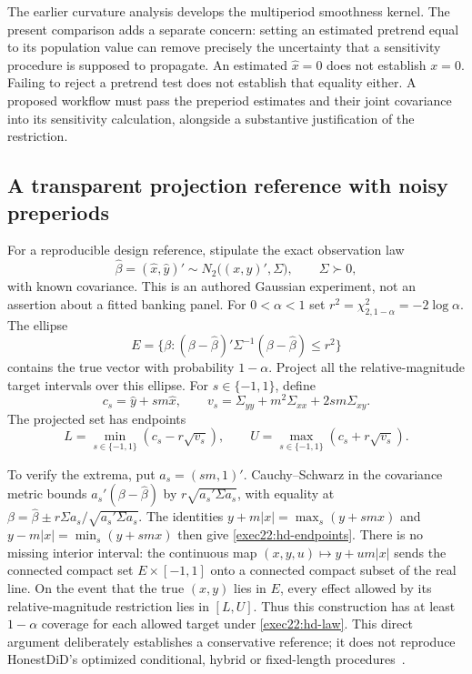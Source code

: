 The earlier curvature analysis develops the multiperiod smoothness kernel.
The present comparison adds a separate concern: setting an estimated pretrend
equal to its population value can remove precisely the uncertainty that a
sensitivity procedure is supposed to propagate. An estimated $\widehat x=0$
does not establish $x=0$. Failing to reject a pretrend test does not establish
that equality either. A proposed workflow must pass the preperiod estimates
and their joint covariance into its sensitivity calculation, alongside a
substantive justification of the restriction.

\subsection{A transparent projection reference with noisy preperiods}
\label{exec22:hd-projection}

For a reproducible design reference, stipulate the exact observation law
\begin{equation}
 \widehat\beta=(\widehat x,\widehat y)'\sim
 N_2\bigl((x,y)',\Sigma\bigr),\qquad \Sigma\succ0,
 \label{exec22:hd-law}
\end{equation}
with known covariance. This is an authored Gaussian experiment, not an
assertion about a fitted banking panel. For $0<\alpha<1$ set
$r^2=\chi^2_{2,1-\alpha}=-2\log\alpha$. The ellipse
\begin{equation}
 E=\{\beta:(\beta-\widehat\beta)'\Sigma^{-1}
                  (\beta-\widehat\beta)\leq r^2\}
 \label{exec22:hd-ellipse}
\end{equation}
contains the true vector with probability $1-\alpha$. Project all the
relative-magnitude target intervals over this ellipse. For $s\in\{-1,1\}$,
define
\begin{equation}
 c_s=\widehat y+sm\widehat x,\qquad
 v_s=\Sigma_{yy}+m^2\Sigma_{xx}+2sm\Sigma_{xy}.
 \label{exec22:hd-components}
\end{equation}
The projected set has endpoints
\begin{equation}
 L=\min_{s\in\{-1,1\}}(c_s-r\sqrt{v_s}),\qquad
 U=\max_{s\in\{-1,1\}}(c_s+r\sqrt{v_s}).
 \label{exec22:hd-endpoints}
\end{equation}

To verify the extrema, put $a_s=(sm,1)'$. Cauchy--Schwarz in the covariance
metric bounds $a_s'(\beta-\widehat\beta)$ by
$r\sqrt{a_s'\Sigma a_s}$, with equality at
$\beta=\widehat\beta\pm r\Sigma a_s/\sqrt{a_s'\Sigma a_s}$.
The identities $y+m|x|=\max_s(y+smx)$ and
$y-m|x|=\min_s(y+smx)$ then give
\eqref{exec22:hd-endpoints}. There is no missing interior interval:
the continuous map $(x,y,u)\mapsto y+um|x|$ sends the connected compact set
$E\times[-1,1]$ onto a connected compact subset of the real line.
On the event that the true $(x,y)$ lies in $E$, every effect allowed by its
relative-magnitude restriction lies in $[L,U]$. Thus this construction has
at least $1-\alpha$ coverage for each allowed target under
\eqref{exec22:hd-law}. This direct argument deliberately establishes a
conservative reference; it does not reproduce HonestDiD's optimized conditional,
hybrid or fixed-length procedures~\citep{exec22_honestdid_reference}.

